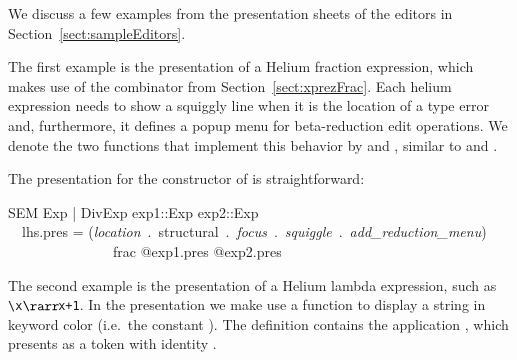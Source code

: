 

We discuss a few examples from the presentation sheets of the editors in Section~\ref{sect:sampleEditors}.


The first example is the presentation of a Helium fraction expression, which makes use of the  combinator from Section~\ref{sect:xprezFrac}. Each helium expression needs to show a squiggly line when it is the location of a type error and, furthermore, it defines a popup menu for beta-reduction edit operations. We denote the two functions that implement this behavior by  and , similar to  and . 

The presentation for the  constructor of  is straightforward:

\ttfamily\begin{small}\begin{tabbing}
SEM Exp | DivExp exp1::Exp exp2::Exp \\
~~lhs.pres = ({\em location}~.~structural~.~{\em focus}~.~{\em squiggle}~.~{\em add\_reduction\_menu})\\
~~~~~~~~~~~~~~~frac @exp1.pres @exp2.pres
\end{tabbing}\end{small}\rmfamily


The second example is the presentation of a Helium lambda expression, such as \verb|\x|$\rarr\!$\verb|x+1|. In the presentation we make  use a function  to display a string in keyword color (i.e.\ the constant ). The definition  contains the application , which  presents  as a token with identity .

\begin{small}
\\
\end{small}

